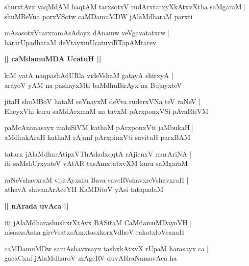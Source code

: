 \documentclass[twoside,12pt,openright]{book}
\newcounter{shloka}[chapter]
\def\uvaca#1{\centerline{{\large\textbf{#1}}}}
\begin{document}
\begin{shloka}%
shurxtAvx vaqMdAM haqtAM tarxsotxV rudArxtatxyXkAtxvXtha saMgaraM |\\
shuMBeVna porxVSotw caMDamuMDW jAlaMdharaM parxti
\end{shloka}

\begin{shloka}%
mAsasotxVtarxramAsAdayx dAnamw veVgavatatxrw |\\
hararUpadharaM deYtayxmUcatuviRTapAMtarev 
\end{shloka}

\uvaca{|| caMdamuMDA UcatuH ||}

\begin{shloka}%
kiM yatA naqpashAdURla videVshaM gatayA shirxyA |\\
arayoV yAM na pashayxMti baMdhuBirAyx na BujayxteV 
\end{shloka}

\begin{shloka}%
jitaH shuMBoV hataM seYnayxM deVva ruderxVNa teV raNeV |\\
EheyxVhi kuru saMdArxmaM na tavxM pArxponxVSi pAvaRtiVM 
\end{shloka}

\begin{shloka}%
paMcAnanasayx mahiSiVM kathaM pArxponxVti jaMbukaH |\\
aMdhakAraH kathaM rAjanf pArxpinxVti savituH parxBAM 
\end{shloka}

\begin{shloka}%
tatarx jAlaMdharAtipxVThAdadxqqtA rAjicnxV murAriNA |\\
iti saMshUrxyateV vAtAR tasAmxtatxvXM kuru saMgaraM 
\end{shloka}

\begin{shloka}%
raNeVshavxraM vijitAyxshu Bava saveRVshavxreVshavxraH |\\
athavA shivanArAceYH KaMDitoV yAsi tatapxdaM 
\end{shloka}

\uvaca{|| nArada uvAca ||}

\begin{shloka}%
iti jAlaMdharashushxrXtAvx BASitaM CaMdamuMDayoVH |\\
nisasxsAsha gireVsatxsAmxtasxkorxVdhoV rakatxloVcanaH 
\end{shloka}

\begin{shloka}%
caMDamuMDw samAshavxsayx tashxkAtxvX rUpaM harasayx ca |\\
gacaCxnf jAlaMdharoV mAgeRV duvARraNamavAca ha 
\end{shloka}
\end{document}
